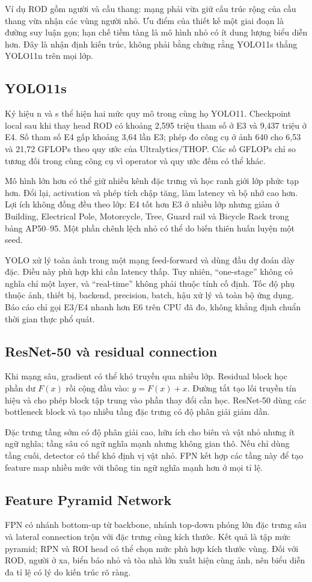 \documentclass[12pt,a4paper,oneside]{report}
\begin{document}
Ví dụ ROD gồm người và cầu thang: mạng phải vừa giữ cấu trúc rộng của cầu thang vừa nhận các vùng người nhỏ. Ưu điểm của thiết kế một giai đoạn là đường suy luận gọn; hạn chế tiềm tàng là mô hình nhỏ có ít dung lượng biểu diễn hơn. Đây là nhận định kiến trúc, không phải bằng chứng rằng YOLO11s thắng YOLO11n trên mọi lớp. 
\subsection{YOLO11s}
Ký hiệu n và s thể hiện hai mức quy mô trong cùng họ YOLO11. Checkpoint local sau khi thay head ROD có khoảng 2,595 triệu tham số ở E3 và 9,437 triệu ở E4. Số tham số E4 gấp khoảng 3,64 lần E3; phép đo công cụ ở ảnh 640 cho 6,53 và 21,72 GFLOPs theo quy ước của Ultralytics/THOP. Các số GFLOPs chỉ so tương đối trong cùng công cụ vì operator và quy ước đếm có thể khác.

Mô hình lớn hơn có thể giữ nhiều kênh đặc trưng và học ranh giới lớp phức tạp hơn. Đổi lại, activation và phép tích chập tăng, làm latency và bộ nhớ cao hơn. Lợi ích không đồng đều theo lớp: E4 tốt hơn E3 ở nhiều lớp nhưng giảm ở Building, Electrical Pole, Motorcycle, Tree, Guard rail và Bicycle Rack trong bảng AP50--95. Một phần chênh lệch nhỏ có thể do biến thiên huấn luyện một seed.

YOLO xử lý toàn ảnh trong một mạng feed-forward và dùng đầu dự đoán dày đặc. Điều này phù hợp khi cần latency thấp. Tuy nhiên, “one-stage” không có nghĩa chỉ một layer, và “real-time” không phải thuộc tính cố định. Tốc độ phụ thuộc ảnh, thiết bị, backend, precision, batch, hậu xử lý và toàn bộ ứng dụng. Báo cáo chỉ gọi E3/E4 nhanh hơn E6 trên CPU đã đo, không khẳng định chuẩn thời gian thực phổ quát.
\subsection{ResNet-50 và residual connection}
Khi mạng sâu, gradient có thể khó truyền qua nhiều lớp. Residual block học phần dư $F(x)$ rồi cộng đầu vào: $y=F(x)+x$. Đường tắt tạo lối truyền tín hiệu và cho phép block tập trung vào phần thay đổi cần học. ResNet-50 dùng các bottleneck block và tạo nhiều tầng đặc trưng có độ phân giải giảm dần.

Đặc trưng tầng sớm có độ phân giải cao, hữu ích cho biên và vật nhỏ nhưng ít ngữ nghĩa; tầng sâu có ngữ nghĩa mạnh nhưng không gian thô. Nếu chỉ dùng tầng cuối, detector có thể khó định vị vật nhỏ. FPN kết hợp các tầng này để tạo feature map nhiều mức với thông tin ngữ nghĩa mạnh hơn ở mọi tỉ lệ.
\subsection{Feature Pyramid Network}
FPN có nhánh bottom-up từ backbone, nhánh top-down phóng lớn đặc trưng sâu và lateral connection trộn với đặc trưng cùng kích thước. Kết quả là tập mức pyramid; RPN và ROI head có thể chọn mức phù hợp kích thước vùng. Đối với ROD, người ở xa, biển báo nhỏ và tòa nhà lớn xuất hiện cùng ảnh, nên biểu diễn đa tỉ lệ có lý do kiến trúc rõ ràng.
\end{document}
